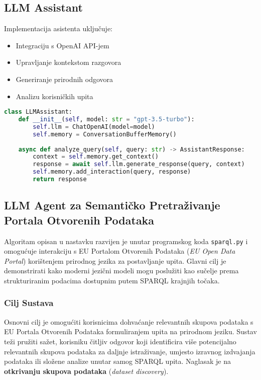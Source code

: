 \subsection{LLM Assistant}
Implementacija asistenta uključuje:
\begin{itemize}
    \item Integraciju s OpenAI API-jem
    \item Upravljanje kontekstom razgovora
    \item Generiranje prirodnih odgovora
    \item Analizu korisničkih upita
\end{itemize}

\begin{lstlisting}[language=Python, caption=Implementacija LLM Asistenta]
class LLMAssistant:
    def __init__(self, model: str = "gpt-3.5-turbo"):
        self.llm = ChatOpenAI(model=model)
        self.memory = ConversationBufferMemory()
    
    async def analyze_query(self, query: str) -> AssistantResponse:
        context = self.memory.get_context()
        response = await self.llm.generate_response(query, context)
        self.memory.add_interaction(query, response)
        return response
\end{lstlisting}

\subsection{LLM Agent za Semantičko Pretraživanje Portala Otvorenih Podataka}
\label{sec:llm_agent_sparql}

Algoritam opisan u nastavku razvijen je unutar programskog koda \texttt{sparql.py} i omogućuje interakciju s EU Portalom Otvorenih Podataka (\textit{EU Open Data Portal}) korištenjem prirodnog jezika za postavljanje upita. Glavni cilj je demonstrirati kako moderni jezični modeli mogu poslužiti kao sučelje prema strukturiranim podacima dostupnim putem SPARQL krajnjih točaka.

\subsubsection{Cilj Sustava}
\label{sec:llm_agent_objective_sparql}
Osnovni cilj je omogućiti korisnicima dohvaćanje relevantnih skupova podataka s EU Portala Otvorenih Podataka formuliranjem upita na prirodnom jeziku. Sustav teži pružiti sažet, korisniku čitljiv odgovor koji identificira više potencijalno relevantnih skupova podataka za daljnje istraživanje, umjesto izravnog izdvajanja podataka ili složene analize unutar samog SPARQL upita. Naglasak je na \textbf{otkrivanju skupova podataka} (\textit{dataset discovery}).

